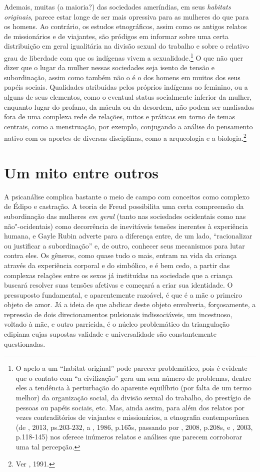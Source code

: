 Ademais, muitas (a maioria?) das sociedades ameríndias, em seus
\emph{habitats originais}, parece estar longe de ser mais opressiva para
as mulheres do que para os homens. Ao contrário, os estudos
etnográficos, assim como os antigos relatos de missionários e de
viajantes, são pródigos em informar sobre uma certa distribuição em
geral igualitária na divisão sexual do trabalho e sobre o relativo grau
de liberdade com que os indígenas vivem a sexualidade.\footnote{O apelo
  a um ``habitat original'' pode parecer problemático, pois é evidente
  que o contato com ``a civilização'' gera um sem número de problemas,
  dentre eles a tendência à perturbação do aparente equilíbrio (por
  falta de um termo melhor) da organização social, da divisão sexual do
  trabalho, do prestígio de pessoas ou papéis sociais, etc. Mas, ainda
  assim, para além dos relatos por vezes contraditórios de viajantes e
  missionários, a etnografia contemporânea (de , 2013,
  ps.203-232, a , 1986, p.165s, passando por
  , 2008, p.208s, e , 2003, p.118-145) nos oferece
  inúmeros relatos e análises que parecem corroborar uma tal percepção.}
O que não quer dizer que o lugar da mulher nessas sociedades seja isento
de tensão e subordinação, assim como também não o é o dos homens em
muitos dos seus papéis sociais. Qualidades atribuídas pelos próprios
indígenas ao feminino, ou a alguns de seus elementos, como o eventual
status socialmente inferior da mulher, enquanto lugar do profano, da
mácula ou da desordem, não podem ser analisados fora de uma complexa
rede de relações, mitos e práticas em torno de temas centrais, como a
menstruação, por exemplo, conjugando a análise do pensamento nativo com
os aportes de diversas disciplinas, como a arqueologia e a
biologia.\footnote{Ver , 1991.}

\section{Um mito entre outros}

A psicanálise complica bastante o meio de campo com conceitos como
complexo de Édipo e castração. A teoria de Freud possibilita uma certa
compreensão da subordinação das mulheres \emph{em geral} (tanto nas
sociedades ocidentais como nas não"-ocidentais) como decorrência de
inevitáveis tensões inerentes à experiência humana, e Gayle Rubin
adverte para a diferença entre, de um lado, ``racionalizar ou justificar
a subordinação'' e, de outro, conhecer seus mecanismos para lutar contra
eles. Os gêneros, como quase tudo o mais, entram na vida da criança
através da experiência corporal e do simbólico, e é bem cedo, a partir
das complexas relações entre os sexos já instituídas na sociedade que a
criança buscará resolver suas tensões afetivas e começará a criar sua
identidade. O pressuposto fundamental, e aparentemente razoável, é que é
a mãe o primeiro objeto de amor. Já a ideia de que abdicar deste objeto
envolveria, forçosamente, a repressão de dois direcionamentos pulsionais
indissociáveis, um incestuoso, voltado à mãe, e outro parricida, é o
núcleo problemático da triangulação edipiana cujas supostas validade e
universalidade são constantemente questionadas.

